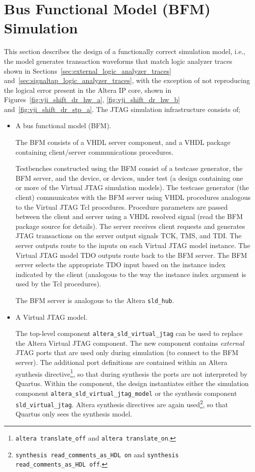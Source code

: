 \documentclass[10pt,twoside]{article}
\begin{document}
\clearpage
\section{Bus Functional Model (BFM) Simulation}
\label{sec:simulation_model}

This section describes the design of a functionally correct simulation
model, i.e., the model generates transaction waveforms that
match logic analyzer traces shown in 
Sections~\ref{sec:external_logic_analyzer_traces}
and~\ref{sec:signaltap_logic_analyzer_traces},
with the exception of not reproducing the logical error present
in the Altera IP core, shown in Figures~\ref{fig:vji_shift_dr_hw_a},
\ref{fig:vji_shift_dr_hw_b} and~\ref{fig:vji_shift_dr_stp_a}.
The JTAG simulation infrastructure consists of;
%
\begin{itemize}
\item A bus functional model (BFM). 

The BFM consists of a VHDL server component, and a VHDL package
containing client/server communications procedures. 

Testbenches constructed using the BFM consist of a testcase generator,
the BFM server, and the device, or devices, under test (a design containing
one or more of the Virtual JTAG simulation models). The testcase generator
(the client) communicates with the BFM server using VHDL procedures 
analogous to the Virtual JTAG Tcl procedures. Procedure parameters are
passed between the client and server using a VHDL resolved signal
(read the BFM package source for details). The server receives client
requests and generates JTAG transactions on the server output signals
TCK, TMS, and TDI. The server outputs route to the inputs on each Virtual
JTAG model instance. The Virtual JTAG model TDO outputs route back
to the BFM server. The BFM server selects the appropriate TDO input 
based on the instance index indicated by the client (analogous to
the way the instance index argument is used by the Tcl procedures).

The BFM server is analogous to the Altera \verb+sld_hub+.

\item A Virtual JTAG model.

The top-level component \verb+altera_sld_virtual_jtag+ can be used to
replace the Altera Virtual JTAG component. The new component
contains {\em external} JTAG ports that are used only during simulation
(to connect to the BFM server).
The additional port definitions are contained within an Altera synthesis
directive\footnote{{\tt altera translate\_off} and 
{\tt altera translate\_on}.}, so that during synthesis the ports are 
not interpreted by Quartus.
Within the component, the design instantiates either the
simulation component \verb+altera_sld_virtual_jtag_model+ or the
synthesis component \verb+sld_virtual_jtag+. Altera synthesis directives
are again used\footnote{{\tt synthesis read\_comments\_as\_HDL on} and
{\tt synthesis read\_comments\_as\_HDL off}.}, so that Quartus only sees
the synthesis model.
\end{itemize}
\end{document}
